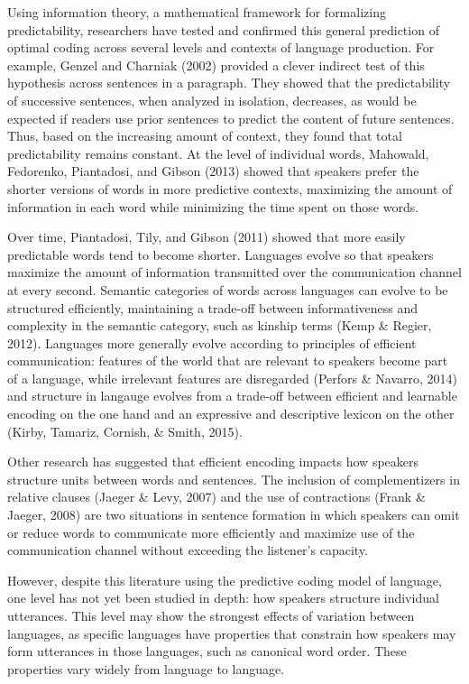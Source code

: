 \documentclass[man,floatsintext]{apa6}
\begin{document}
Using information theory, a mathematical framework for formalizing predictability, researchers have tested and confirmed this general prediction of optimal coding across several levels and contexts of language production. For example, Genzel and Charniak (2002) provided a clever indirect test of this hypothesis across sentences in a paragraph. They showed that the predictability of successive sentences, when analyzed in isolation, decreases, as would be expected if readers use prior sentences to predict the content of future sentences. Thus, based on the increasing amount of context, they found that total predictability remains constant. At the level of individual words, Mahowald, Fedorenko, Piantadosi, and Gibson (2013) showed that speakers prefer the shorter versions of words in more predictive contexts, maximizing the amount of information in each word while minimizing the time spent on those words.

Over time, Piantadosi, Tily, and Gibson (2011) showed that more easily predictable words tend to become shorter. Languages evolve so that speakers maximize the amount of information transmitted over the communication channel at every second. Semantic categories of words across languages can evolve to be structured efficiently, maintaining a trade-off between informativeness and complexity in the semantic category, such as kinship terms (Kemp \& Regier, 2012). Languages more generally evolve according to principles of efficient communication: features of the world that are relevant to speakers become part of a language, while irrelevant features are disregarded (Perfors \& Navarro, 2014) and structure in langauge evolves from a trade-off between efficient and learnable encoding on the one hand and an expressive and descriptive lexicon on the other (Kirby, Tamariz, Cornish, \& Smith, 2015).

Other research has suggested that efficient encoding impacts how speakers structure units between words and sentences. The inclusion of complementizers in relative clauses (Jaeger \& Levy, 2007) and the use of contractions (Frank \& Jaeger, 2008) are two situations in sentence formation in which speakers can omit or reduce words to communicate more efficiently and maximize use of the communication channel without exceeding the listener's capacity.

However, despite this literature using the predictive coding model of language, one level has not yet been studied in depth: how speakers structure individual utterances. This level may show the strongest effects of variation between languages, as specific languages have properties that constrain how speakers may form utterances in those languages, such as canonical word order. These properties vary widely from language to language.
\end{document}
